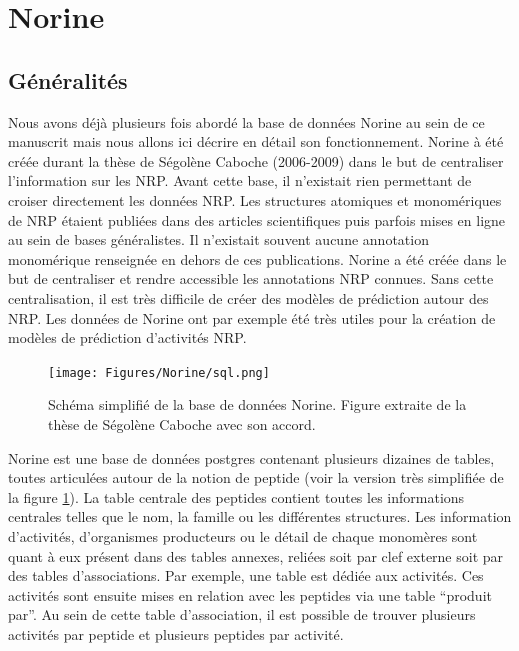 \section{Norine}

\subsection{Généralités}

Nous avons déjà plusieurs fois abordé la base de données Norine au sein de ce manuscrit mais nous allons ici décrire en détail son fonctionnement.
Norine à été créée durant la thèse de Ségolène Caboche (2006-2009) dans le but de centraliser l'information sur les NRP.
Avant cette base, il n'existait rien permettant de croiser directement les données NRP.
Les structures atomiques et monomériques de NRP étaient publiées dans des articles scientifiques puis parfois mises en ligne au sein de bases généralistes.
Il n'existait souvent aucune annotation monomérique renseignée en dehors de ces publications.
Norine a été créée dans le but de centraliser et rendre accessible les annotations NRP connues.
Sans cette centralisation, il est très difficile de créer des modèles de prédiction autour des NRP.
Les données de Norine ont par exemple été très utiles pour la création de modèles de prédiction d'activités NRP.

\begin{figure}[h!]
  \begin{center}
    \texttt{[image: Figures/Norine/sql.png]}
    \caption{\label{sql}Schéma simplifié de la base de données Norine.
    Figure extraite de la thèse de Ségolène Caboche avec son accord.}
  \end{center}
\end{figure}

Norine est une base de données postgres contenant plusieurs dizaines de tables, toutes articulées autour de la notion de peptide (voir la version très simplifiée de la figure \ref{sql}).
La table centrale des peptides contient toutes les informations centrales telles que le nom, la famille ou les différentes structures.
Les information d'activités, d'organismes producteurs ou le détail de chaque monomères sont quant à eux présent dans des tables annexes, reliées soit par clef externe soit par des tables d'associations.
Par exemple, une table est dédiée aux activités.
Ces activités sont ensuite mises en relation avec les peptides via une table ``produit par''.
Au sein de cette table d'association, il est possible de trouver plusieurs activités par peptide et plusieurs peptides par activité.

